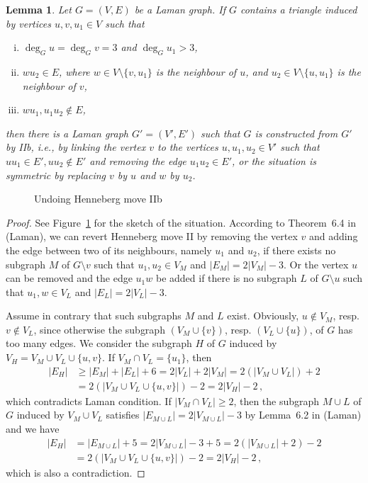 \documentclass[a4paper, 11pt]{article}
\newtheorem{lem}[thm]{Lemma}
\theoremstyle{definition}
\begin{document}
\begin{lem}
\label{lem:undoIIb}
Let $G=(V,E)$ be a Laman graph. If $G$ contains a triangle induced by vertices $u,v, u_1\in V$ such that
\begin{enumerate}[i)]
\item $\deg_G u =\deg_G v=3$ and $\deg_G u_1>3$,
\item $wu_2\in E$, where $w\in V\setminus \{v, u_1\}$ is the neighbour of $u$, and $u_2\in V\setminus \{u, u_1\}$ is the neighbour of $v$,
\item $wu_1,u_1u_2\notin E$,
\end{enumerate}
then there is a Laman graph $G'=(V',E')$ such that $G$ is constructed from $G'$ by IIb, i.e., by linking the vertex $v$  to the vertices $u,u_1,u_2 \in V'$ such that $uu_1\in E',uu_2\notin E'$ and removing the edge $u_1u_2\in E'$, or the situation is symmetric by replacing $v$ by $u$ and $w$ by $u_2$. 
\end{lem}
\begin{figure}[htb!]
\centering

\caption{Undoing Henneberg move IIb}
\label{fig:undoIIb}
\end{figure}
\begin{proof}
See Figure~\ref{fig:undoIIb} for the sketch of the situation.
According to Theorem~6.4 in (Laman), we can revert Henneberg move II by removing the vertex $v$ and adding the edge between two of its neighbours, namely $u_1$ and $u_2$, if there exists no subgraph $M$ of $G\setminus v$ such that $u_1,u_2\in V_M$ and $|E_M|=2|V_M|-3$. Or the vertex $u$ can be removed and the edge $u_1w$ be added if there is no subgraph $L$ of $G\setminus u$ such that $u_1,w\in V_L$ and $|E_L|=2|V_L|-3$.

Assume in contrary that such subgraphs $M$ and $L$ exist. Obviously, $u\notin V_M$, resp. $v\notin V_L$, since otherwise the subgraph $(V_M\cup\{v\})$, resp. $(V_L\cup\{u\})$, of $G$ has too many edges. We consider the subgraph $H$ of $G$ induced by $V_H=V_M\cup V_L \cup \{u,v\}$. If $V_M\cap V_L=\{u_1\}$, then
\begin{align*}
|E_H|&\geq|E_M|+|E_L|+6=2|V_L|+2|V_M|=2(|V_M \cup V_L|)+2\\
&=2(|V_M \cup V_L \cup \{u,v\}|)-2=2|V_H|-2\,,
\end{align*}
which contradicts Laman condition. If $|V_M\cap V_L|\geq 2$, then the subgraph $M\cup L$ of $G$ induced by $V_M\cup V_L$ satisfies $|E_{M\cup L}|=2|V_{M\cup L}|-3$ by Lemma~6.2 in  (Laman) and we have
\begin{align*}
|E_H|&=|E_{M\cup L}|+5=2|V_{M\cup L}|-3+5=2(|V_{M\cup L}|+2)-2\\
&=2(|V_M \cup V_L \cup \{u,v\}|)-2=2|V_H|-2\,,
\end{align*}
which is also a contradiction.
\end{proof}
\end{document}
